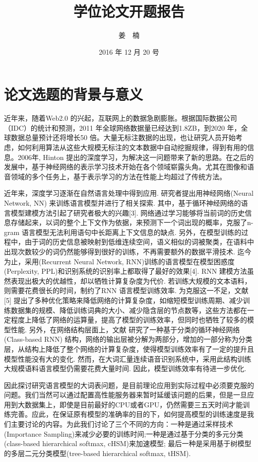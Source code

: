 \documentclass[12pt,a4paper]{article}
\title{学位论文开题报告}
\author{姜~~楠}
\date{2016 年 12 月 20 号}
\begin{document}
\maketitle

\tableofcontents
\newpage


\section{论文选题的背景与意义}
近年来，随着Web2.0 的兴起，互联网上的数据急剧膨胀。根据国际数据公司（IDC）的统计和预测，2011 年全球网络数据量已经达到1.8ZB，到2020 年，全球数据总量预计还将增长50 倍。大量无标注数据的出现，也让研究人员开始考虑，如何利用算法从这些大规模无标注的文本数据中自动挖掘规律，得到有用的信息。2006年, Hinton 提出的深度学习\cite{hinton2006reducing}，为解决这一问题带来了新的思路。在之后的发展中，基于神经网络的表示学习技术开始在各个领域崭露头角。尤其在图像和语音领域的多个任务上，基于表示学习的方法在性能上均超过了传统方法。

近年来，深度学习逐渐在自然语言处理中得到应用. 研究者提出用神经网络(Neural Network, NN) 来训练语言模型并进行了相关探索\cite{DBLP:conf/nips/BengioDV00}. 其中，基于循环神经网络的语言模型建模方法引起了研究者极大的兴趣[3]. 网络通过学习能够将当前词的历史信息存储起来，以词的整个上下文作为依据，来预测下一个词出现的概率，克服了n-gram 语言模型无法利用语句中长距离上下文信息的缺点. 另外，在模型训练的过程中，由于词的历史信息被映射到低维连续空间，语义相似的词被聚类，在语料中出现次数较少的词仍然能够得到很好的训练，不再需要额外的数据平滑技术. 迄今为止，采用(Recurrent Neural Network, RNN)训练的语言模型在模型困惑度(Perplexity, PPL)和识别系统的识别率上都取得了最好的效果[4]. RNN 建模方法虽然表现出极大的优越性，却以牺牲计算复杂度为代价. 若训练大规模的文本语料，则需要花费很长的时间，制约了RNN 语言模型训练效率. 为克服这一不足，文献[5] 提出了多种优化策略来降低网络的计算复杂度，如缩短模型训练周期、减少训练数据集的规模、降低训练词典的大小、减少隐含层的节点数等，这些方法都在一定程度上降低了网络的运算量，提高了模型的训练效率，但同时也牺牲了较多的模型性能. 另外，在网络结构层面上，文献\cite{DBLP:journals/coling/BrownPdLM92} 研究了一种基于分类的循环神经网络(Class-based RNN) 结构，网络的输出层被分解为两部分，增加的一部分称为分类层，从结构上降低了整个网络的计算复杂度，使得模型训练效率有了一定的提升且模型性能没有大的变化. 然而，在大词汇量连续语音识别系统中，采用此结构训练大规模语料语言模型仍需要花费大量时间. 因此，模型训练效率有待进一步优化.

因此探讨研究语言模型的大词表问题，是目前理论应用到实际过程中必须要克服的问题。我们当然可以通过配置高性能服务器来暂时延缓该问题的后果，但是一旦应用到大数据集上，即使是目前最好的CPU或者GPU，仍然需要三五天时间才能训练完善。应此，在保证原有模型的准确率的目的下，如何提高模型的训练速度是我们主要讨论的内容。为此我们讨论了三个不同的方向：一种是通过采样技术(Importance Sampling)来减少必要的训练时间;一种是通过基于分类的多元分类(class-based hierarchical softmax, cHSM)来加速模型; 最后一种是采用基于树模型的多层二元分类模型(tree-based hierarchical softmax, tHSM).
\end{document}
